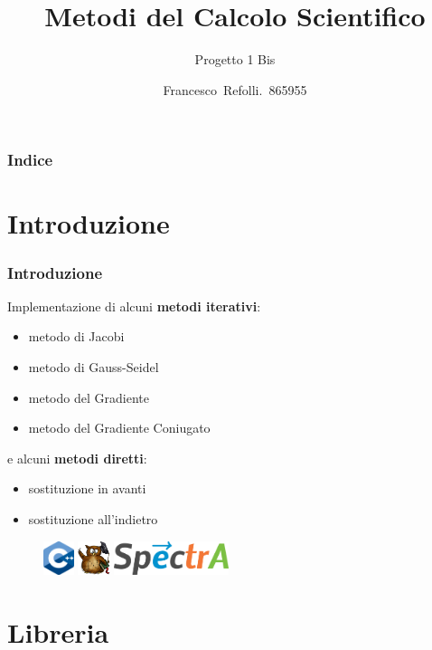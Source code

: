 \documentclass{beamer}
\title{Metodi del Calcolo Scientifico}
\subtitle{Progetto 1 Bis}
\author{Francesco~Refolli.~865955}
\begin{document}
\frame{\titlepage}

\begin{frame}
\frametitle{Indice}
\tableofcontents
\end{frame}

\section{Introduzione}

\begin{frame}
\frametitle{Introduzione}

Implementazione di alcuni \textbf{metodi iterativi}:
\begin{itemize}
  \item metodo di Jacobi
  \item metodo di Gauss-Seidel
  \item metodo del Gradiente
  \item metodo del Gradiente Coniugato
\end{itemize}

e alcuni \textbf{metodi diretti}:
\begin{itemize}
  \item sostituzione in avanti
  \item sostituzione all'indietro
\end{itemize}

\begin{figure}
  \centering
  \includegraphics[height=1cm]{images/cpp.png}
  \hspace{0.5cm}
  \includegraphics[height=1cm]{images/eigen.png}
  \hspace{0.5cm}
  \includegraphics[height=1cm]{images/spectra.png}
\end{figure}

\end{frame}

\section{Libreria}
\end{document}

